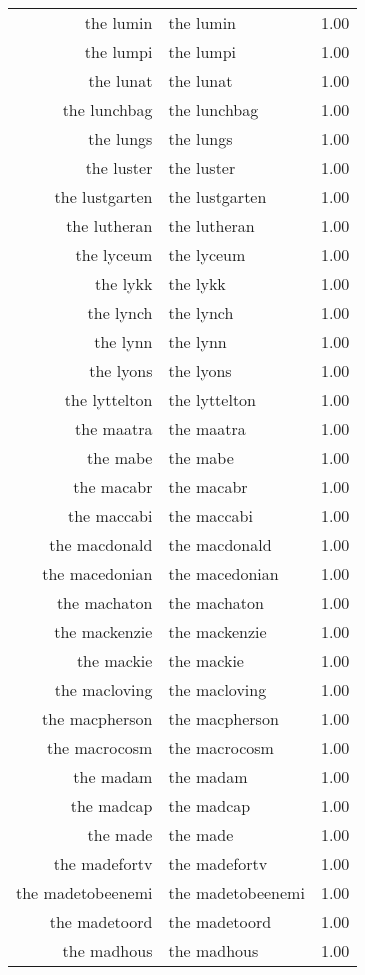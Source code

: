 \begin{table}[ht]
\begin{tabular}{rlr}
  the lumin & the lumin & 1.00 \\ 
  the lumpi & the lumpi & 1.00 \\ 
  the lunat & the lunat & 1.00 \\ 
  the lunchbag & the lunchbag & 1.00 \\ 
  the lungs & the lungs & 1.00 \\ 
  the luster & the luster & 1.00 \\ 
  the lustgarten & the lustgarten & 1.00 \\ 
  the lutheran & the lutheran & 1.00 \\ 
  the lyceum & the lyceum & 1.00 \\ 
  the lykk & the lykk & 1.00 \\ 
  the lynch & the lynch & 1.00 \\ 
  the lynn & the lynn & 1.00 \\ 
  the lyons & the lyons & 1.00 \\ 
  the lyttelton & the lyttelton & 1.00 \\ 
  the maatra & the maatra & 1.00 \\ 
  the mabe & the mabe & 1.00 \\ 
  the macabr & the macabr & 1.00 \\ 
  the maccabi & the maccabi & 1.00 \\ 
  the macdonald & the macdonald & 1.00 \\ 
  the macedonian & the macedonian & 1.00 \\ 
  the machaton & the machaton & 1.00 \\ 
  the mackenzie & the mackenzie & 1.00 \\ 
  the mackie & the mackie & 1.00 \\ 
  the macloving & the macloving & 1.00 \\ 
  the macpherson & the macpherson & 1.00 \\ 
  the macrocosm & the macrocosm & 1.00 \\ 
  the madam & the madam & 1.00 \\ 
  the madcap & the madcap & 1.00 \\ 
  the made & the made & 1.00 \\ 
  the madefortv & the madefortv & 1.00 \\ 
  the madetobeenemi & the madetobeenemi & 1.00 \\ 
  the madetoord & the madetoord & 1.00 \\ 
  the madhous & the madhous & 1.00 \\ 

\end{tabular}
\end{table}
